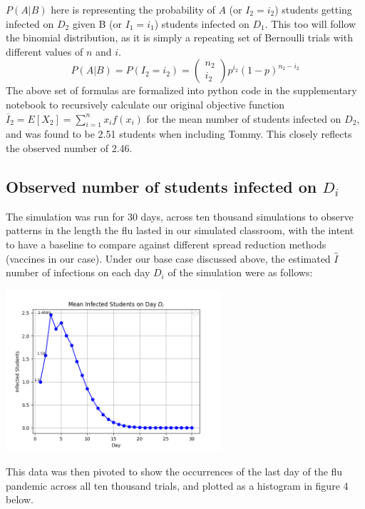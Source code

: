 \documentclass[
	letterpaper, %
]{jdf}
\begin{document}
\(P(A|B)\) here is representing the probability of \(A\) (or \(I_2=i_2\)) students getting infected on \(D_2\) given B (or \(I_1=i_1\)) students infected on \(D_1\). This too will follow the binomial distribution, as it is simply a repeating set of Bernoulli trials with different values of \(n\) and  \(i\).
\[P(A|B) = P(I_2 = i_2) = \left(\begin{array}{l}
n_2 \\
i_2
\end{array}\right) p^{i_2}(1-p)^{n_2-i_2}\]
The above set of formulas are formalized into python code in the supplementary notebook to recursively calculate our original objective function \(\overline{I}_2 = E[X_2]= \sum_{i=1}^{n}x_if(x_i)\) for the mean number of students infected on \(D_2\), and was found to be 2.51 students when including Tommy. This closely reflects the observed number of 2.46. 

\subsection{Observed number of students infected on \(D_i\)}
The simulation was run for 30 days, across ten thousand simulations to observe patterns in the length the flu lasted in our simulated classroom, with the intent to have a baseline to compare against different spread reduction methods (vaccines in our case). Under our base case discussed above, the estimated \(\hat{I}\) number of infections on each day \(D_i\) of the simulation were as follows:

\begin{jdffigure}
\includegraphics[height=6cm]{Figures/q4a.png}%
\end{jdffigure}

This data was then pivoted to show the occurrences of the last day of the flu pandemic across all ten thousand trials, and plotted as a histogram in figure 4 below.
\end{document}
